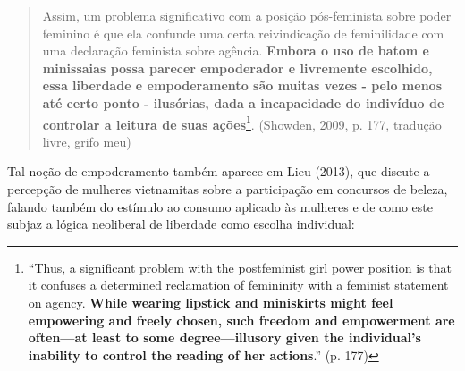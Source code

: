 \begin{quote}
    Assim, um problema significativo com a posição pós-feminis\-ta sobre poder feminino é que ela confunde uma certa reivindicação de feminilidade com uma declaração feminista sobre agência. \textbf{Embora o uso de batom e minissaias possa parecer empoderador e livremente escolhido, essa liberdade e empoderamento são muitas vezes - pelo menos até certo ponto - ilusórias, dada a incapacidade do indivíduo de controlar a leitura de suas ações}\footnote{``Thus, a significant problem with the postfeminist girl power position is that it confuses a determined reclamation of femininity with a feminist statement on agency. \textbf{While wearing lipstick and miniskirts might feel empowering and freely chosen, such freedom and empowerment are often—at least to some degree—illusory given the individual’s inability to control the reading of her actions}.'' (p. 177)}. (Showden, 2009, p. 177, tradução livre, grifo meu) 
\end{quote}

Tal noção de empoderamento também aparece em Lieu (2013), que discute a percepção de mulheres vietnamitas sobre a participação em concursos de beleza, falando também do estímulo ao consumo aplicado às mulheres e de como este subjaz a lógica neoliberal de liberdade como escolha individual:

